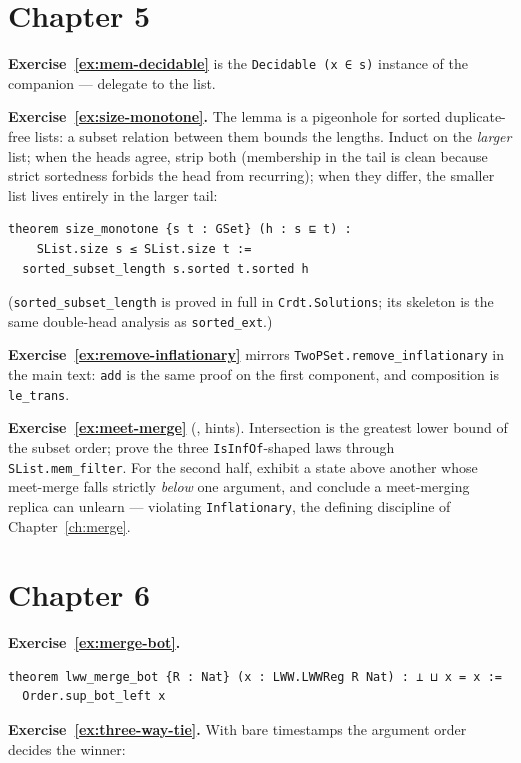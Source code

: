 \documentclass[12pt, a4paper, openright]{book}
\theoremstyle{thmstyle}
\theoremstyle{defstyle}
\newcommand{\lc}[1]{\texttt{#1}}
\begin{document}
\section*{Chapter 5}

\textbf{Exercise~\ref{ex:mem-decidable}} is the \lc{Decidable (x ∈ s)}
instance of the companion --- delegate to the list.

\textbf{Exercise~\ref{ex:size-monotone}.} The lemma is a pigeonhole for
sorted duplicate-free lists: a subset relation between them bounds the
lengths. Induct on the \emph{larger} list; when the heads agree, strip
both (membership in the tail is clean because strict sortedness
forbids the head from recurring); when they differ, the smaller list
lives entirely in the larger tail:

\begin{verbatim}
theorem size_monotone {s t : GSet} (h : s ⊑ t) :
    SList.size s ≤ SList.size t :=
  sorted_subset_length s.sorted t.sorted h
\end{verbatim}

(\lc{sorted_subset_length} is proved in full in \lc{Crdt.Solutions};
its skeleton is the same double-head analysis as \lc{sorted_ext}.)

\textbf{Exercise~\ref{ex:remove-inflationary}} mirrors
\lc{TwoPSet.remove_inflationary} in the main text: \lc{add} is the same
proof on the first component, and composition is \lc{le_trans}.

\textbf{Exercise~\ref{ex:meet-merge}} (,
hints). Intersection is the greatest lower bound of the subset order;
prove the three \lc{IsInfOf}-shaped laws through
\lc{SList.mem_filter}. For the second half, exhibit a state above
another whose meet-merge falls strictly \emph{below} one argument, and
conclude a meet-merging replica can unlearn --- violating
\lc{Inflationary}, the defining discipline of Chapter~\ref{ch:merge}.

\section*{Chapter 6}

\textbf{Exercise~\ref{ex:merge-bot}.}

\begin{verbatim}
theorem lww_merge_bot {R : Nat} (x : LWW.LWWReg R Nat) : ⊥ ⊔ x = x :=
  Order.sup_bot_left x
\end{verbatim}

\textbf{Exercise~\ref{ex:three-way-tie}.} With bare timestamps the
argument order decides the winner:
\end{document}
